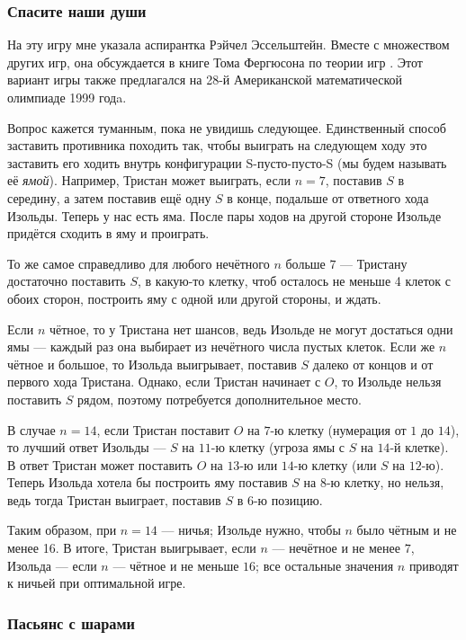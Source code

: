 \subsubsection*{Спасите наши души}

На эту игру мне указала аспирантка Рэйчел Эссельштейн.
Вместе с множеством других игр, она обсуждается в книге Тома Фергюсона по теории игр \cite{ferguson}.
Этот вариант игры также предлагался на 28-й Американской математической олимпиаде 1999 годa.

Вопрос кажется туманным, пока не увидишь следующее.
Единственный способ заставить противника походить так, чтобы выиграть на следующем ходу это заставить его ходить внутрь конфигурации S-пусто-пусто-S (мы будем называть её \emph{ямой}).
Например, Тристан может выиграть, если $n = 7$, поставив $S$ в середину, а затем поставив ещё одну $S$ в конце, подальше от ответного хода Изольды.
Теперь у нас есть яма.
После пары ходов на другой стороне Изольде придётся сходить в яму и проиграть.

То же самое справедливо для любого нечётного $n$ больше $7$ --- Тристану достаточно поставить $S$, 
в какую-то клетку, чтоб осталось не меньше 4 клеток с обоих сторон, построить яму с одной или другой стороны, и ждать.

Если $n$ чётное, то у Тристана нет шансов, ведь Изольде не могут достаться одни ямы --- каждый раз она выбирает из нечётного числа пустых клеток.
Если же $n$ чётное и большое, то Изольда выигрывает, поставив $S$ далеко от концов и от первого хода Тристана.
Однако, если Тристан начинает с $O$, то Изольде нельзя поставить $S$ рядом, поэтому потребуется дополнительное место.

В случае $n = 14$, если Тристан поставит $O$ на $7$-ю клетку (нумерация от $1$ до $14$), то лучший ответ Изольды --- $S$ на $11$-ю клетку (угроза ямы с $S$ на $14$-й клетке).
В ответ Тристан может поставить $O$ на $13$-ю или $14$-ю клетку (или $S$ на $12$-ю). 
Теперь Изольда хотела бы построить яму поставив $S$ на $8$-ю клетку, но нельзя, ведь тогда Тристан выиграет, поставив $S$ в $6$-ю позицию.

Таким образом, при $n = 14$ --- ничья;
Изольде нужно, чтобы $n$ было чётным и не менее 16.
В итоге, Тристан выигрывает, если $n$ --- нечётное и не менее $7$,
Изольда --- если $n$ --- чётное и не меньше $16$;
все остальные значения $n$ приводят к ничьей при оптимальной игре.

\subsubsection*{Пасьянс с шарами}


